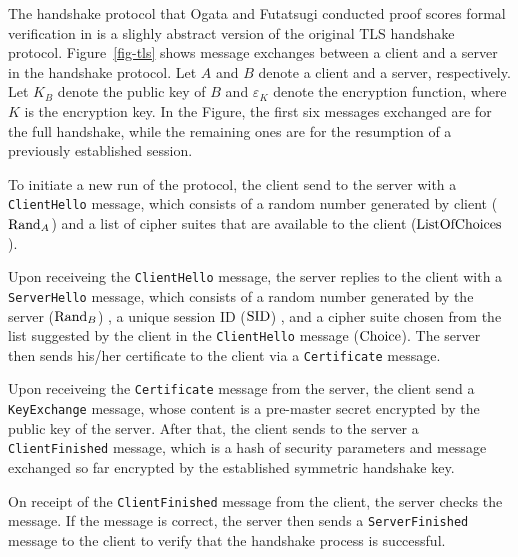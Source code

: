 \documentclass[a4paper,fleqn]{cas-dc}
\begin{document}
The handshake protocol that Ogata and Futatsugi conducted proof scores formal verification in \cite{ogata05} is a slighly abstract version of the original TLS handshake protocol.
Figure~\ref{fig-tls} shows message exchanges between a client and a server in the handshake protocol. 
Let $A$ and $B$ denote a client and a server, respectively. 
Let $K_B$ denote the public key of $B$ and $\varepsilon_K$ denote the encryption function, where $K$ is the encryption key.
In the Figure, the first six messages exchanged are for the full handshake, while the remaining ones are for the resumption of a previously established session.

To initiate a new run of the protocol, the client send to the server with a \verb!ClientHello! message, which consists of
a random number generated by client (${\rm Rand}_A$) and a list of cipher suites that are available to the client (${\rm ListOfChoices}$).

Upon receiveing the \verb!ClientHello! message, the server replies to the client with a \verb!ServerHello! message, which consists of a random number generated by the server  (${\rm Rand}_B$) ,
 a unique session ID ($\rm SID$) , and a cipher suite chosen from the list suggested by the client in the \verb!ClientHello! message (${\rm Choice}$).
The server then sends  his/her certificate to the client via a \verb!Certificate! message.

Upon receiveing the \verb!Certificate! message from the server, the client send a \verb!KeyExchange! message, whose content is  a pre-master secret encrypted by the public key of the server.
After that, the client sends to the server  a \verb!ClientFinished! message, which is a hash of security parameters and message exchanged so far encrypted by the established symmetric handshake key.

On receipt of the \verb!ClientFinished! message from the client, the server
checks the message. If the message is correct, the server then sends a \verb!ServerFinished! message to the client to verify that the handshake process is successful.

\end{document}
